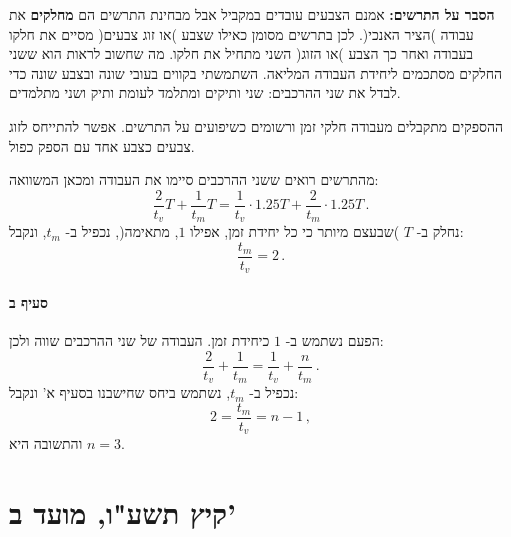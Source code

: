 \documentclass[12pt,a4paper]{article}
\begin{document}
\smallskip

\noindent\textbf{הסבר על התרשים:}
אמנם הצבעים עובדים במקביל אבל מבחינת התרשים הם
\textbf{מחלקים}
את עבודה )הציר האנכי(. לכן בתרשים מסומן כאילו שצבע )או זוג צבעים( מסיים את חלקו בעבודה ואחר כך הצבע )או הזוג( השני מתחיל את חלקו. מה שחשוב לראות הוא ששני החלקים מסתכמים ליחידת העבודה המליאה. השתמשתי בקווים בעובי שונה ובצבע שונה כדי לבדל את שני ההרכבים: שני ותיקים ומתלמד לעומת ותיק ושני מתלמדים.

ההספקים מתקבלים מעבודה חלקי זמן ורשומים כשיפועים על התרשים.  אפשר להתייחס לזוג צבעים כצבע אחד עם הספק כפול.

\smallskip

מהתרשים רואים ששני ההרכבים סיימו את העבודה ומכאן המשוואה:
\[
\frac{2}{t_v}T + \frac{1}{t_m} T = \frac{1}{t_v} \cdot 1.25T + \frac{2}{t_m} \cdot 1.25 T\,.
\]
נחלק ב-
$T$
)שבעצם מיותר כי כל יחידת זמן, אפילו
$1$,
מתאימה(, נכפיל ב-
$t_m$,
ונקבל:
\[
\frac{t_m}{t_v}=2\,.
\]

\paragraph{סעיף ב}

\begin{center}
\end{center}

הפעם נשתמש ב-
$1$
כיחידת זמן. העבודה של שני ההרכבים שווה ולכן:
\[
\frac{2}{t_v} + \frac{1}{t_m} = \frac{1}{t_v} + \frac{n}{t_m}\,.
\]
נכפיל ב-
$t_m$,
נשתמש ביחס שחישבנו בסעיף א' ונקבל:
\[
2=\frac{t_m}{t_v}=n-1\,,
\]
והתשובה היא
$n=3$.

\newpage

\section*{קיץ תשע"ו, מועד ב'}
\end{document}
